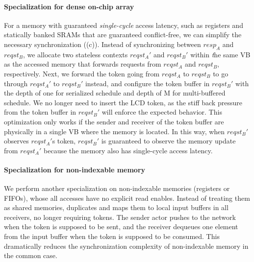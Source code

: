 \paragraph{Specialization for dense on-chip array}
For a memory with guaranteed {\em single-cycle} access latency, such as registers and statically banked SRAMs that are guaranteed conflict-free, we can simplify the necessary synchronization ((c)).
Instead of synchronizing between $resp_A$ and $reqst_B$, we allocate two stateless contexts $reqst_A'$ and $reqst_B'$ within {\emph the same} VB as the accessed memory that forwards requests from $reqst_A$ and $reqst_B$, respectively.
Next, we forward the token going from $reqst_A$ to $reqst_B$ to go through $reqst_A'$ to $reqst_B'$ instead, and configure the token buffer in $reqst_B'$ with the depth of one for serialized schedule and depth of M for multi-buffered schedule. 
We no longer need to insert the LCD token, as the stiff back pressure from the token buffer in $reqst_B'$ will enforce the expected behavior.
This optimization only works if the sender and receiver of the token buffer are physically in a single VB where the memory is located.
In this way, when $reqst_B'$ observes $reqst_A'$s token, $reqst_B'$ is guaranteed to observe the memory update from $reqst_A'$ because the memory also has single-cycle access latency.

\paragraph{Specialization for non-indexable memory}
We perform another specialization on non-indexable memories (registers or FIFOs), whose all accesses have no explicit read enables.
Instead of treating them as shared memories, \name{} duplicates and maps them to local input buffers in all receivers, no longer requiring tokens.
The sender actor pushes to the network when the token is supposed to be sent, and the receiver dequeues one element from the input buffer when the token is supposed to be consumed.
This dramatically reduces the synchronization complexity of non-indexable memory in the common case.

